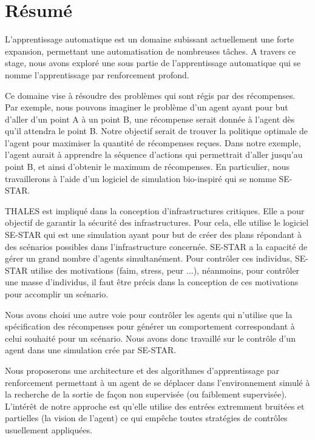 \newpage


\section*{Résumé}
\bigskip

L'apprentissage automatique est un domaine subissant actuellement une forte expansion, permettant une automatisation de nombreuses tâches. A travers ce stage, nous avons exploré une sous partie de l'apprentissage automatique qui se nomme l'apprentissage par renforcement profond. 

Ce domaine vise à résoudre des problèmes qui sont régis par des récompenses. Par exemple, nous pouvons imaginer le problème d'un agent ayant pour but d'aller d'un point A à un point B, une récompense serait donnée à l'agent dès qu'il attendra le point B. Notre objectif serait de trouver la politique optimale de l'agent pour maximiser la quantité de récompenses reçues. Dans notre exemple, l'agent aurait à apprendre la séquence d'actions qui permettrait d'aller jusqu'au point B, et ainsi d'obtenir le maximum de récompenses. En particulier, nous travaillerons à l'aide d'un logiciel de simulation bio-inspiré qui se nomme SE-STAR. 

THALES est impliqué dans la conception d'infrastructures critiques. Elle a pour objectif de garantir la sécurité des infrastructures. Pour cela, elle utilise le logiciel SE-STAR qui est une simulation ayant pour but de créer des plans répondant à des scénarios possibles dans l'infrastructure concernée. SE-STAR a la capacité de gérer un grand nombre d'agents simultanément. Pour contrôler ces individus, SE-STAR utilise des motivations (faim, stress, peur ...), néanmoins, pour contrôler une masse d'individus, il faut être précis dans la conception de ces motivations pour accomplir un scénario.

Nous avons choisi une autre voie pour contrôler les agents qui n'utilise que la spécification des récompenses pour générer un comportement correspondant à celui souhaité pour un scénario.
Nous avons donc travaillé sur le contrôle d'un agent dans une simulation crée par SE-STAR.

Nous proposerons une architecture et des algorithmes d'apprentissage par renforcement permettant à un agent de se déplacer dans l'environnement simulé à la recherche de la sortie de façon non supervisée (ou faiblement supervisée). L'intérêt de notre approche est qu'elle utilise des entrées extremment bruitées et partielles (la vision de l'agent) ce qui empêche toutes stratégies de contrôles usuellement appliquées.

